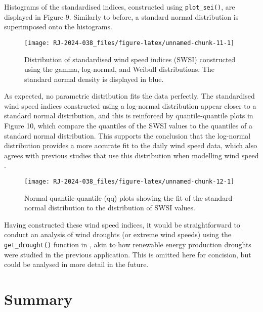 Histograms of the standardised indices, constructed using \texttt{plot\_sei()}, are displayed in Figure 9. Similarly to before, a standard normal distribution is superimposed onto the histograms.

\begin{figure}

{\centering \texttt{[image: RJ-2024-038\_files/figure-latex/unnamed-chunk-11-1]} 

}

\caption{Distribution of standardised wind speed indices (SWSI) constructed using the gamma, log-normal, and Weibull distributions. The standard normal density is displayed in blue.}\label{fig:unnamed-chunk-11}
\end{figure}

As expected, no parametric distribution fits the data perfectly. The standardised wind speed indices constructed using a log-normal distribution appear closer to a standard normal distribution, and this is reinforced by quantile-quantile plots in Figure 10, which compare the quantiles of the SWSI values to the quantiles of a standard normal distribution. This supports the conclusion that the log-normal distribution provides a more accurate fit to the daily wind speed data, which also agrees with previous studies that use this distribution when modelling wind speed \citep[e.g.][]{KolluEtAl2012,BaranLerch2015}.

\begin{figure}

{\centering \texttt{[image: RJ-2024-038\_files/figure-latex/unnamed-chunk-12-1]} 

}

\caption{Normal quantile-quantile (qq) plots showing the fit of the standard normal distribution to the distribution of SWSI values.}\label{fig:unnamed-chunk-12}
\end{figure}

Having constructed these wind speed indices, it would be straightforward to conduct an analysis of wind droughts (or extreme wind speeds) using the \texttt{get\_drought()} function in , akin to how renewable energy production droughts were studied in the previous application. This is omitted here for concision, but could be analysed in more detail in the future.

\hypertarget{summary}{%
\section{Summary}\label{summary}}

